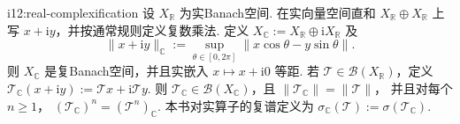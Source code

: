 \begin{FAProposition}[B][实Banach空间的标准复化接口]{i12:real-complexification}
设 \(\displaystyle X_{\mathbb R}\) 为实Banach空间. 在实向量空间直和 \(\displaystyle X_{\mathbb R}\oplus X_{\mathbb R}\) 上写 \(\displaystyle x+\mathrm{i}y\)，并按通常规则定义复数乘法. 定义
\(\displaystyle X_{\mathbb C} := X_{\mathbb R}\oplus\mathrm{i}X_{\mathbb R}\)
及
\[
\|x+\mathrm{i}y\|_{\mathbb C}
:=
\sup_{\theta\in[0,2\pi]}
\|x\cos\theta-y\sin\theta\|.
\]
则 \(\displaystyle X_{\mathbb C}\) 是复Banach空间，并且实嵌入 \(\displaystyle x\mapsto x+\mathrm{i}0\) 等距. 若 \(\displaystyle \mathcal T\in\mathcal B(X_{\mathbb R})\)，定义
\(\displaystyle \mathcal T_{\mathbb C}(x+\mathrm{i}y) := \mathcal T x+ \mathrm{i}\mathcal T y\).
则 \(\displaystyle \mathcal T_{\mathbb C}\in\mathcal B(X_{\mathbb C})\)，且
\(\displaystyle \|\mathcal T_{\mathbb C}\| = \|\mathcal T\|\)，
并且对每个 \(\displaystyle n\geqslant1\)，
\(\displaystyle (\mathcal T_{\mathbb C})^n = (\mathcal T^n)_{\mathbb C}\).
本书对实算子的复谱定义为
\(\displaystyle \sigma_{\mathbb C}(\mathcal T) := \sigma(\mathcal T_{\mathbb C})\).
\end{FAProposition}

